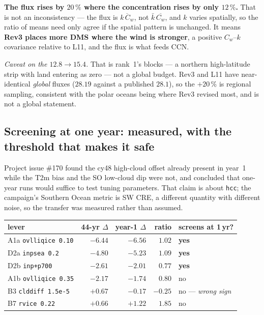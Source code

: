 \documentclass[10pt]{article}
\begin{document}
\noindent \textbf{The flux rises by $20\,\%$ where the concentration rises by only
$12\,\%$.} That is not an inconsistency --- the flux is $\overline{k\,C_w}$, not
$\bar{k}\,\overline{C_w}$, and $k$ varies spatially, so the ratio of means need only agree
if the spatial pattern is unchanged. It means \textbf{Rev3 places more DMS where the wind
is stronger}, a positive $C_w$--$k$ covariance relative to L11, and the flux is what feeds
CCN.

\emph{Caveat on the $12.8\to15.4$.} That is rank~1's blocks --- a northern high-latitude
strip with land entering as zero --- not a global budget. Rev3 and L11 have near-identical
\emph{global} fluxes ($28.19$ against a published $28.1$), so the $+20\,\%$ is regional
sampling, consistent with the polar oceans being where Rev3 revised most, and is not a
global statement.

\subsection{Screening at one year: measured, with the threshold that makes it
safe}\label{sub:r24screen}
Project issue \#170 found the cy48 high-cloud offset already present in year~1 while the T2m
bias and the SO low-cloud dip were not, and concluded that one-year runs would suffice to
test tuning parameters. That claim is about \texttt{hcc}; the campaign's Southern Ocean
metric is SW CRE, a different quantity with different noise, so the transfer was measured
rather than assumed.

\begin{center}\footnotesize
\begin{tabular}{l r r r l}
\toprule
lever & 44-yr $\Delta$ & \textbf{year-1 $\Delta$} & ratio & screens at 1\,yr? \\
\midrule
A1a \texttt{ovlliqice 0.10} & $-6.44$ & $\mathbf{-6.56}$ & $1.02$ & \textbf{yes} \\
D2a \texttt{inpsea 0.2} & $-4.80$ & $\mathbf{-5.23}$ & $1.09$ & \textbf{yes} \\
D2b \texttt{inp+p700} & $-2.61$ & $\mathbf{-2.01}$ & $0.77$ & \textbf{yes} \\
A1b \texttt{ovlliqice 0.35} & $-2.17$ & $-1.74$ & $0.80$ & no \\
B3 \texttt{clddiff 1.5e-5} & $+0.67$ & $-0.17$ & $\mathbf{-0.25}$ & no --- \emph{wrong sign} \\
B7 \texttt{rvice 0.22} & $+0.66$ & $+1.22$ & $1.85$ & no \\
\bottomrule
\end{tabular}
\end{center}
\end{document}
